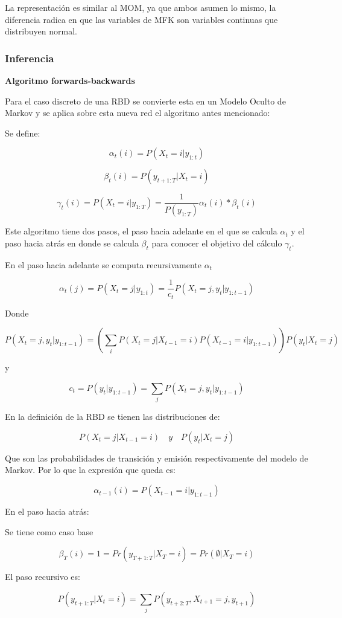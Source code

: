 \documentclass[]{article}
\begin{document}
La representación es similar al MOM, ya que ambos asumen lo mismo, la
diferencia radica en que las variables de MFK son variables continuas
que distribuyen normal.

\subsubsection{Inferencia}\label{header-n33}

\textbf{Algoritmo forwards-backwards}

Para el caso discreto de una RBD se convierte esta en un Modelo Oculto
de Markov y se aplica sobre esta nueva red el algoritmo antes
mencionado:

Se define:

$$\alpha_t(i) = P(X_t = i | y_{1:t})$$

$$\beta_t(i) = P(y_{t+1:T} | X_t=i)$$

$$\gamma_t(i) = P(X_t=i | y_{1:T}) = \frac{1}{P(y_{1:T})} \alpha_t(i) * \beta_t(i)$$

Este algoritmo tiene dos pasos, el paso hacia adelante en el que se
calcula $\alpha_t$ y el paso hacia atrás en donde
se calcula $\beta_t$ para conocer el objetivo del
cálculo $\gamma_t$.

En el paso hacia adelante se computa recursivamente $\alpha_t$

$$\alpha_t(j) = P(X_t = j|y_{1:t}) = \frac{1}{c_t}P(X_t = j, y_t|y_{1:t-1})$$

Donde

$$P(X_t = j, y_t|y_{1:t-1}) = (\sum_i P(X_t = j | X_{t-1} = i) P(X_{t-1}=i|y_{1:t-1})) P(y_t|X_t=j)$$

y

$$c_t = P(y_t|y_{1:t-1}) = \sum_j P(X_t = j, y_t | y_{1:t-1})$$

En la definición de la RBD se tienen las distribuciones de:

$$P(X_t = j | X_{t-1} = i) \quad y \quad P(y_t|X_t=j)$$

Que son las probabilidades de transición y emisión respectivamente del
modelo de Markov. Por lo que la expresión que queda es:

$$\alpha_{t-1}(i) = P(X_{t-1}=i|y_{1:t-1})$$

En el paso hacia atrás:

Se tiene como caso base

$$\beta_T(i) = 1 = Pr(y_{T+1:T}|X_T=i) = Pr(\emptyset|X_T = i)$$

El paso recursivo es:

$$P(y_{t+1:T}| X_t = i) = \sum_j P(y_{t+2:T}, X_{t+1}=j, y_{t+1})$$
\end{document}
